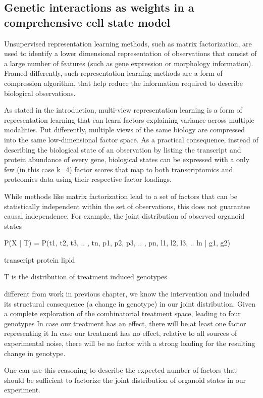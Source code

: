 \begin{flushleft}
\section{Genetic interactions as weights in a comprehensive cell state model}




Unsupervised representation learning methods, such as matrix factorization, are used to identify a lower dimensional representation of observations that consist of a large number of features (such as gene expression or morphology information). Framed differently, such representation learning methods are a form of compression algorithm, that help reduce the information required to describe biological observations. 

As stated in the introduction, multi-view representation learning is a form of representation learning that can learn factors explaining variance across multiple modalities. Put differently, multiple views of the same biology are compressed into the same low-dimensional factor space. As a practical consequence, instead of describing the biological state of an observation by listing the transcript and protein abundance of every gene, biological states can be expressed with a only few (in this case k=4) factor scores that map to both transcriptomics and proteomics data using their respective factor loadings. 

While methods like matrix factorization lead to a set of factors that can be statistically independent within the set of observations, this does not guarantee causal independence. For example, the joint distribution of observed organoid states 

P(X | T) = P(t1, t2, t3, .. , tn, p1, p2, p3, .. , pn, l1, l2, l3, .. ln | g1, g2) 


transcript
protein 
lipid

T is the distribution of treatment induced genotypes




different from work in previous chapter, we know the intervention and included its structural consequence (a change in genotype) in our joint distribution.
Given a complete exploration of the combinatorial treatment space, leading to four genotypes
In case our treatment has an effect, there will be at least one factor representing it
In case our treatment has no effect, relative to all sources of experimental noise, there will be no factor with a strong loading for the resulting change in genotype.
 
One can use this reasoning to describe the expected number of factors that should be sufficient to factorize the joint distribution of organoid states in our experiment. 


\end{flushleft}
